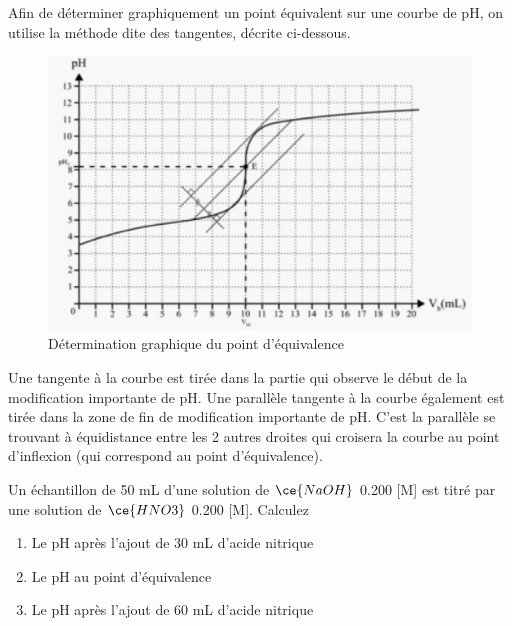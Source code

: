 \documentclass[
  11pt,
  french,
  a4paper,
  openany]{book}
\providecommand{\tightlist}{%
  \setlength{\itemsep}{0pt}\setlength{\parskip}{0pt}}
\begin{document}
Afin de déterminer graphiquement un point équivalent sur une courbe de pH, on utilise la méthode dite des tangentes, décrite ci-dessous.

\begin{figure}

{\centering \includegraphics[width=0.75\linewidth]{images/acides-bases-7} 

}

\caption{Détermination graphique du point d'équivalence}\label{fig:acides-bases-7}
\end{figure}

Une tangente à la courbe est tirée dans la partie qui observe le début de la modification importante de pH. Une parallèle tangente à la courbe également est tirée dans la zone de fin de modification importante de pH. C'est la parallèle se trouvant à équidistance entre les 2 autres droites qui croisera la courbe au point d'inflexion (qui correspond au point d'équivalence).

\clearpage

\begin{Exercise}

Un échantillon de 50 mL d'une solution de \(\ce{NaOH}\) 0.200 {[}M{]} est titré par une solution de \(\ce{HNO3}\) 0.200 {[}M{]}. Calculez

\begin{enumerate}
\def\labelenumi{\alph{enumi}.}
\tightlist
\item
  Le pH après l'ajout de 30 mL d'acide nitrique
\item
  Le pH au point d'équivalence
\item
  Le pH après l'ajout de 60 mL d'acide nitrique
\end{enumerate}


\end{Exercise}
\end{document}

